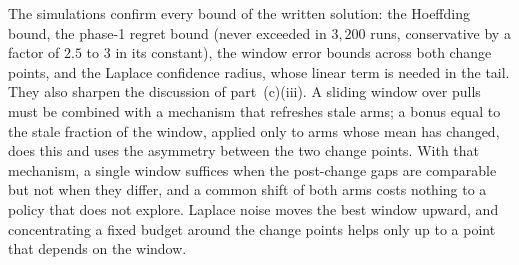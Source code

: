 The simulations confirm every bound of the written solution: the Hoeffding bound, the phase-1 regret bound (never exceeded in $3{,}200$ runs, conservative by a factor of $2.5$ to $3$ in its constant), the window error bounds across both change points, and the Laplace confidence radius, whose linear term is needed in the tail. They also sharpen the discussion of part~(c)(iii). A sliding window over pulls must be combined with a mechanism that refreshes stale arms; a bonus equal to the stale fraction of the window, applied only to arms whose mean has changed, does this and uses the asymmetry between the two change points. With that mechanism, a single window suffices when the post-change gaps are comparable but not when they differ, and a common shift of both arms costs nothing to a policy that does not explore. Laplace noise moves the best window upward, and concentrating a fixed budget around the change points helps only up to a point that depends on the window.
